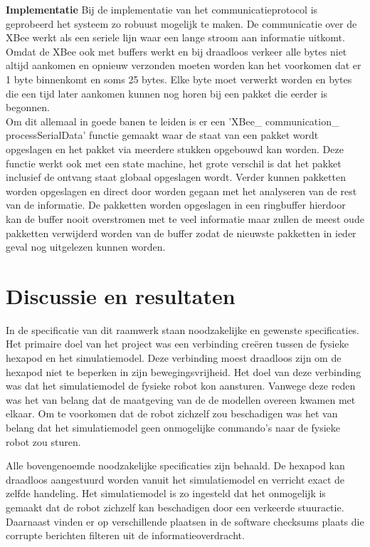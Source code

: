 \documentclass[10pt,a4paper]{article}
\begin{document}
\textbf{Implementatie}
Bij de implementatie van het communicatieprotocol is geprobeerd het systeem zo robuust mogelijk te maken. De communicatie over de XBee werkt als een seriele lijn waar een lange stroom aan informatie uitkomt. Omdat de XBee ook met buffers werkt en bij draadloos verkeer alle bytes niet altijd aankomen en opnieuw verzonden moeten worden kan het voorkomen dat er 1 byte binnenkomt en soms 25 bytes. Elke byte moet verwerkt worden en bytes die een tijd later aankomen kunnen nog horen bij een pakket die eerder is begonnen.\\
Om dit allemaal in goede banen te leiden is er een  'XBee\_ communication\_ processSerialData' functie gemaakt waar de staat van een pakket wordt opgeslagen en het pakket via meerdere stukken opgebouwd kan worden. Deze functie werkt ook met een state machine, het grote verschil is dat het pakket inclusief de ontvang staat globaal opgeslagen wordt. Verder kunnen pakketten worden opgeslagen en direct door worden gegaan met het analyseren van de rest van de informatie. De pakketten worden opgeslagen in een ringbuffer hierdoor kan de buffer nooit overstromen met te veel informatie maar zullen de meest oude pakketten verwijderd worden van de buffer zodat de nieuwste pakketten in ieder geval nog uitgelezen kunnen worden.\\

\newpage


\section{Discussie en resultaten}
In de specificatie van dit raamwerk staan noodzakelijke en gewenste specificaties.
Het primaire doel van het project was een verbinding cre\"eren tussen de fysieke hexapod en het simulatiemodel. Deze verbinding moest draadloos zijn om de hexapod niet te beperken in zijn bewegingsvrijheid. Het doel van deze verbinding was dat het simulatiemodel de fysieke robot kon aansturen. Vanwege deze reden was het van belang dat de maatgeving van de de modellen overeen kwamen met elkaar. Om te voorkomen dat de robot zichzelf zou beschadigen was het van belang dat het simulatiemodel geen onmogelijke commando's naar de fysieke robot zou sturen.

Alle bovengenoemde noodzakelijke specificaties zijn behaald. De hexapod kan draadloos aangestuurd worden vanuit het simulatiemodel en verricht exact de zelfde handeling. Het simulatiemodel is zo ingesteld dat het onmogelijk is gemaakt dat de robot zichzelf kan beschadigen door een verkeerde stuuractie. Daarnaast vinden er op verschillende plaatsen in de software checksums plaats die corrupte berichten filteren uit de informatieoverdracht.
\end{document}
